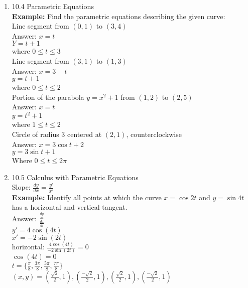 \documentclass[11pt]{article}
\begin{document}
\begin{enumerate}
\item 10.4 Parametric Equations
\\
\textbf{Example:} Find the parametric equations describing the given curve:
 \\
 Line segment from $(0, 1)$ to $(3,4)$
    \\
    Answer: $x=t$
    \\
    $Y=t+1$
    \\
    where $0 \le t \le 3$
    \\
    Line segment from $(3, 1)$ to $(1,3)$
    \\
    Answer: $x=3-t$
    \\
    $y=t+1$
    \\
    where $0 \le t \le 2$
  \\
    Portion of the parabola $y=x^2+1$ from $(1, 2)$ to $(2,5)$
    \\
    Answer: $x=t$
    \\
    $y=t^2+1$
    \\
    where $1 \le t \le 2$ 
   \\ 
    Circle of radius 3 centered at $(2, 1)$, counterclockwise
\\
Answer: $x=3 \cos t +2$
\\
$y=3 \sin t +1$
\\
Where $0 \le t \le 2 \pi$
\\

\item 10.5 Calculus with Parametric Equations
\\
Slope: $\frac{dy}{dx}=\frac{y'}{x'}$
\\
\textbf{Example:} Identify all points at which the curve $x=\cos 2t$ and $y=\sin 4t$ has a horizontal and vertical tangent.  
\\
Answer: $\frac{\frac{dy}{dt}}{\frac{dx}{dt}}$
\\
$y'=4 \cos (4t)$
\\
$x'=-2\sin (2t)$
\\
horizontal: $\frac{4 \cos (4t)}{-2 \sin (2t)}=0$
\\
$\cos (4t) =0$
\\
$t= \{ \frac{\pi}{8}, \frac{3\pi}{8}, \frac{5 \pi}{8}, \frac{7 \pi}{8} \}$
\\
$(x,y)=(\frac{\sqrt{2}}{2},1),(\frac{-\sqrt{2}}{2}, 1),(\frac{\sqrt{2}}{2},1), (\frac{-\sqrt{2}}{2}, 1)  $


\end{enumerate}
\end{document}
